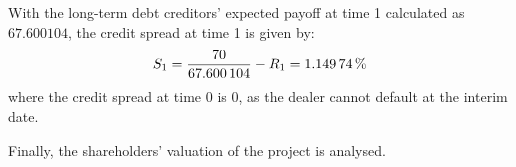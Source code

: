 \documentclass[main.tex]{subfiles}
\begin{document}
            With the long-term debt creditors' expected payoff at time 1 calculated as $\num{67.600104}$,
            the credit spread at time 1 is given by:
            \begin{equation}
                S_1 =
                \frac{
                    \num{70}
                }{
                    \num{67.600104}
                }
                - R_{1}
                \nonumber
                = \pct{0.0114974}
            \end{equation}
            where the credit spread at time 0 is 0,
            as the dealer cannot default at the interim date.
            
            Finally, the shareholders' valuation of the project is analysed.

            
\end{document}
